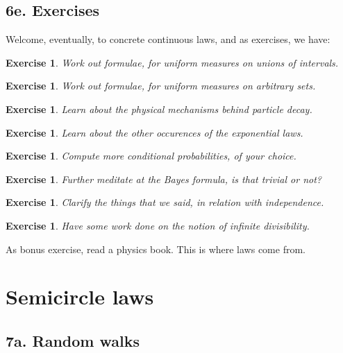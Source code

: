 \documentclass[12pt]{amsbook}
\newtheorem{exercise}[theorem]{Exercise}
\begin{document}
\section*{6e. Exercises}

Welcome, eventually, to concrete continuous laws, and as exercises, we have:

\begin{exercise}
Work out formulae, for uniform measures on unions of intervals.
\end{exercise}

\begin{exercise}
Work out formulae, for uniform measures on arbitrary sets.
\end{exercise}

\begin{exercise}
Learn about the physical mechanisms behind particle decay.
\end{exercise}

\begin{exercise}
Learn about the other occurences of the exponential laws.
\end{exercise}

\begin{exercise}
Compute more conditional probabilities, of your choice.
\end{exercise}

\begin{exercise}
Further meditate at the Bayes formula, is that trivial or not?
\end{exercise}

\begin{exercise}
Clarify the things that we said, in relation with independence.
\end{exercise}

\begin{exercise}
Have some work done on the notion of infinite divisibility.
\end{exercise}

As bonus exercise, read a physics book. This is where laws come from.

\chapter{Semicircle laws}

\section*{7a. Random walks}
\end{document}
